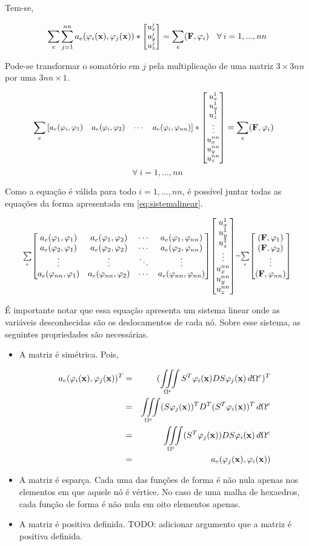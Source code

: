 Tem-se,

\begin{equation}\small
\sum\limits_e \sum_{j=1}^{nn} a_e(\varphi_i(\mathbf{x}),\varphi_j(\mathbf{x}))  * \begin{bmatrix} u^j_x \\ u^j_y \\ u^j_z \end{bmatrix}
=  \sum\limits_e (\mathbf{F}, \varphi_{i}) \quad \forall \: i=1,...,nn
\end{equation}


Pode-se transformar o somatório em $j$ pela multiplicação de uma matriz $3\times3nn$ por uma $3nn\times1$.

\begin{equation}\small
\sum\limits_e  \begin{bmatrix} a_e(\varphi_{i}, \varphi_{1}) & a_e(\varphi_{i}, \varphi_{2}) & \cdots & a_e(\varphi_{i}, \varphi_{nn}) \end{bmatrix}  * \begin{bmatrix} u^{1}_x \\ u^{1}_y \\ u^{1}_z \\ \vdots\\ u^{nn}_x \\ u^{nn}_y \\ u^{nn}_z \end{bmatrix}
=  \sum\limits_e (\mathbf{F}, \varphi_{i}) \quad
\end{equation}
\begin{equation*}
  \forall \: i=1,...,nn
\end{equation*}


Como a equação é válida para todo $i=1,...,nn$, é possível juntar todas as equações da forma apresentada em \ref{eq:sistemalinear}.

\begin{equation}\scriptstyle
\sum\limits_e\aemat\libvetor = \sum\limits_e \begin{bmatrix}
\ldint[1] \\
\ldint[2] \\
\vdots    \\
\ldint[nn]
\end{bmatrix}
\label{eq:sistemalinear}
\end{equation}

É importante notar que essa equação apresenta um sistema linear onde as variáveis desconhecidas são os deslocamentos de cada nó. Sobre esse sistema, as seguintes propriedades são necessárias.

\begin{itemize}
    \item A matriz é simétrica. Pois,

    \begin{eqnarray}
    a_e(\varphi_i(\mathbf{x}),\varphi_j(\mathbf{x}))^T & = & (\iiint\limits_{\Omega^e} S^T\varphi_i(\mathbf{x}) D S\varphi_j(\mathbf{x}) \, d\Omega^e)^T \\
                         & = & \iiint\limits_{\Omega^e} (S\varphi_j(\mathbf{x}))^T D^T (S^T\varphi_i(\mathbf{x}))^T \, d\Omega^e \\
                         & = & \iiint\limits_{\Omega^e} (S^T\varphi_j(\mathbf{x})) D S \varphi_i(\mathbf{x}) \, d\Omega^e \\
                         & = & a_e(\varphi_j(\mathbf{x}),\varphi_i(\mathbf{x}))
    \end{eqnarray}

    \item A matriz é esparça. Cada uma das funções de forma é não nula apenas nos elementos em que aquele nó é vértice. No caso de uma malha de hexaedros, cada função de forma é não nula em oito elementos apenas.

    \item A matriz é positiva definida. {\color{red}TODO: adicionar argumento que a matriz é positiva definida.}
\end{itemize}

